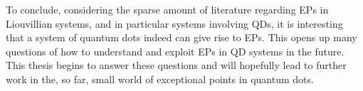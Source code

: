 \documentclass[../main.tex]{subfiles}
\begin{document}
To conclude, considering the sparse amount of literature regarding EPs in Liouvillian systems, and in particular systems involving QDs, it is interesting that a system of quantum dots indeed can give rise to EPs. This opens up many questions of how to understand and exploit EPs in QD systems in the future. This thesis begins to answer these questions and will hopefully lead to further work in the, so far, small world of exceptional points in quantum dots.
\end{document}

